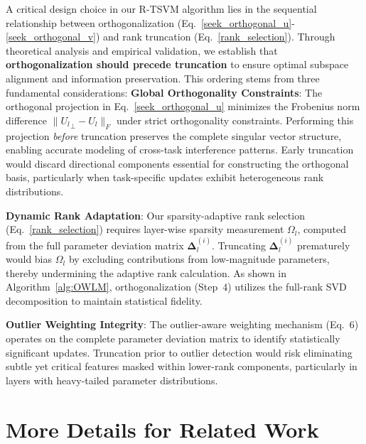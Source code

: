 A critical design choice in our R-TSVM algorithm lies in the sequential relationship between orthogonalization (Eq.~\ref{seek_orthogonal_u}-\ref{seek_orthogonal_v}) and rank truncation (Eq.~\ref{rank_selection}). Through theoretical analysis and empirical validation, we establish that \textbf{orthogonalization should precede truncation} to ensure optimal subspace alignment and information preservation. This ordering stems from three fundamental considerations:
\textbf{Global Orthogonality Constraints}: The orthogonal projection in Eq.~\ref{seek_orthogonal_u} minimizes the Frobenius norm difference $\| {U_{l}}_\bot - U_{l} \|_F$ under strict orthogonality constraints. Performing this projection \textit{before} truncation preserves the complete singular vector structure, enabling accurate modeling of cross-task interference patterns. Early truncation would discard directional components essential for constructing the orthogonal basis, particularly when task-specific updates exhibit heterogeneous rank distributions.

\textbf{Dynamic Rank Adaptation}: Our sparsity-adaptive rank selection (Eq.~\ref{rank_selection}) requires layer-wise sparsity measurement $\Omega_l$, computed from the full parameter deviation matrix $\bm{\Delta}_l^{(i)}$. Truncating $\bm{\Delta}_l^{(i)}$ prematurely would bias $\Omega_l$ by excluding contributions from low-magnitude parameters, thereby undermining the adaptive rank calculation. As shown in Algorithm~\ref{alg:OWLM}, orthogonalization (Step~4) utilizes the full-rank SVD decomposition to maintain statistical fidelity.

\textbf{Outlier Weighting Integrity}: The outlier-aware weighting mechanism (Eq.~6) operates on the complete parameter deviation matrix to identify statistically significant updates. Truncation prior to outlier detection would risk eliminating subtle yet critical features masked within lower-rank components, particularly in layers with heavy-tailed parameter distributions.

\section{More Details for Related Work}\label{more_relatedwork}
